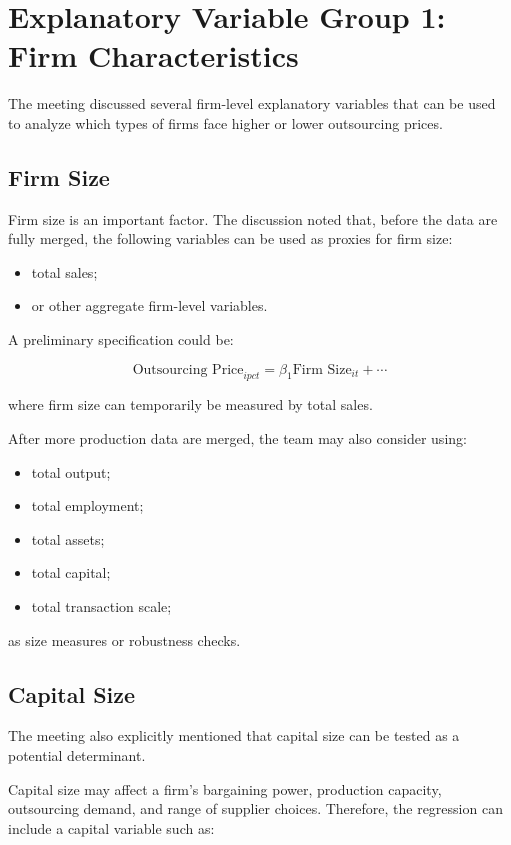 \documentclass[11pt,a4paper]{article}
\begin{document}
\section{Explanatory Variable Group 1: Firm Characteristics}

The meeting discussed several firm-level explanatory variables that can be used to analyze which types of firms face higher or lower outsourcing prices.

\subsection{Firm Size}

Firm size is an important factor. The discussion noted that, before the data are fully merged, the following variables can be used as proxies for firm size:

\begin{itemize}
    \item total sales;
    \item or other aggregate firm-level variables.
\end{itemize}

A preliminary specification could be:

\[
\text{Outsourcing Price}_{i p c t}
=
\beta_1 \text{Firm Size}_{it}
+ \cdots
\]

where firm size can temporarily be measured by total sales.

After more production data are merged, the team may also consider using:

\begin{itemize}
    \item total output;
    \item total employment;
    \item total assets;
    \item total capital;
    \item total transaction scale;
\end{itemize}

as size measures or robustness checks.

\subsection{Capital Size}

The meeting also explicitly mentioned that capital size can be tested as a potential determinant.

Capital size may affect a firm's bargaining power, production capacity, outsourcing demand, and range of supplier choices. Therefore, the regression can include a capital variable such as:
\end{document}
